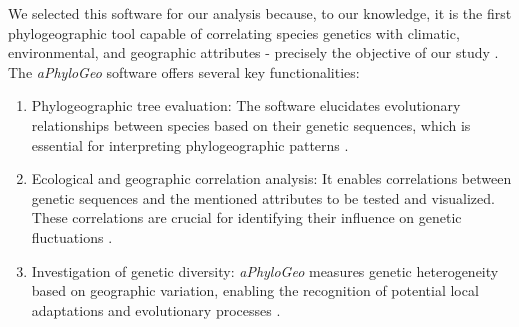 We selected this software for our analysis because, to our knowledge, it is the first phylogeographic tool capable of correlating species genetics with climatic, environmental, and geographic attributes - precisely the objective of our study \citep{koshkarov_phylogeography_2022}. The \textit{aPhyloGeo} software offers several  key functionalities:

\begin{enumerate}[label=\arabic*.]
\item Phylogeographic tree evaluation: The software elucidates evolutionary relationships between species based on their genetic sequences, which is essential for interpreting phylogeographic patterns \citep{koshkarov_phylogeography_2022}.
\item Ecological and geographic correlation analysis: It enables correlations between genetic sequences and the mentioned attributes to be tested and visualized. These correlations are crucial for identifying their influence on genetic fluctuations \citep{koshkarov_phylogeography_2022}.
\item Investigation of genetic diversity: \textit{aPhyloGeo} measures genetic heterogeneity based on geographic variation, enabling the recognition of potential local adaptations and evolutionary processes \citep{manel_perspectives_2010}.
\end{enumerate}

